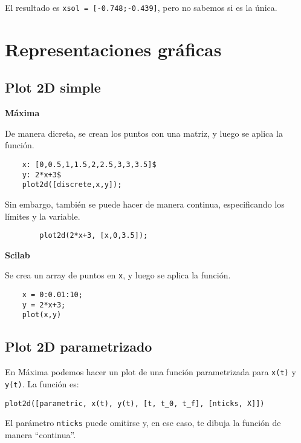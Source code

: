 \documentclass[a4paper]{article}
\begin{document}
El resultado es \verb|xsol = [-0.748;-0.439]|, pero no sabemos si es la única.

\raggedright
\section{Representaciones gráficas}
\raggedright
\subsection{Plot 2D simple}
\begin{multicols}{2}
	\begin{center}
		\textbf{Máxima}
	\end{center}
	De manera dicreta, se crean los puntos con una matriz, y luego se aplica la función.
	\begin{verbatim}
	x: [0,0.5,1,1.5,2,2.5,3,3,3.5]$
	y: 2*x+3$
	plot2d([discrete,x,y]);
	\end{verbatim}
	
	Sin embargo, también se puede hacer de manera continua, especificando los límites y la variable.
	\begin{verbatim}
		plot2d(2*x+3, [x,0,3.5]);
	\end{verbatim}
	\columnbreak
	
	
	\begin{center}
		\textbf{Scilab}
	\end{center}
	Se crea un array de puntos en \verb|x|, y luego se aplica la función.
	\begin{verbatim}
	x = 0:0.01:10;
	y = 2*x+3;
	plot(x,y)
	\end{verbatim}
	
\end{multicols}

\subsection{Plot 2D parametrizado}
En Máxima podemos hacer un plot de una función parametrizada para \verb|x(t)| y \verb|y(t)|. La función es:
\begin{verbatim}
plot2d([parametric, x(t), y(t), [t, t_0, t_f], [nticks, X]])
\end{verbatim}

El parámetro \verb|nticks| puede omitirse y, en ese caso, te dibuja la función de manera ``continua''.
\end{document}
